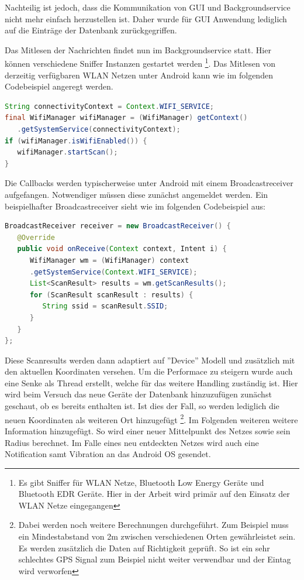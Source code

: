 \documentclass[11pt,a4paper]{article}
\begin{document}
Nachteilig ist jedoch, dass die Kommunikation von GUI und Backgroundservice nicht mehr einfach herzustellen ist. Daher wurde für GUI Anwendung lediglich auf die Einträge der Datenbank zurückgegriffen.

Das Mitlesen der Nachrichten findet nun im Backgroundservice statt. Hier können verschiedene Sniffer Instanzen gestartet werden
\footnote{Es gibt Sniffer für WLAN Netze, Bluetooth Low Energy Geräte und Bluetooth EDR Geräte. Hier in der Arbeit wird primär auf den Einsatz der WLAN Netze eingegangen}.
Das Mitlesen von derzeitig verfügbaren WLAN Netzen unter Android kann wie im folgenden Codebeispiel angeregt werden.

\begin{lstlisting}[language=Java]
String connectivityContext = Context.WIFI_SERVICE;
final WifiManager wifiManager = (WifiManager) getContext()
   .getSystemService(connectivityContext);
if (wifiManager.isWifiEnabled()) {
   wifiManager.startScan();
}
\end{lstlisting}

Die Callbacks werden typischerweise unter Android mit einem Broadcastreceiver aufgefangen. Notwendiger müssen diese zunächst angemeldet werden. Ein beispielhafter Broadcastreceiver sieht wie im folgenden Codebeispiel aus:

\begin{lstlisting}[language=Java]
BroadcastReceiver receiver = new BroadcastReceiver() {
   @Override
   public void onReceive(Context context, Intent i) {
      WifiManager wm = (WifiManager) context
      .getSystemService(Context.WIFI_SERVICE);
      List<ScanResult> results = wm.getScanResults();
      for (ScanResult scanResult : results) {
         String ssid = scanResult.SSID;
      }
   }
};
\end{lstlisting}

Diese Scanresults werden dann adaptiert auf ''Device'' Modell und zusätzlich mit den aktuellen Koordinaten versehen. Um die Performace zu steigern wurde auch eine Senke als Thread erstellt, welche für das weitere Handling zuständig ist. Hier wird beim Versuch das neue Geräte der Datenbank hinzuzufügen zunächst geschaut, ob es bereits enthalten ist. Ist dies der Fall, so werden lediglich die neuen Koordinaten als weiteren Ort hinzugefügt
\footnote{Dabei werden noch weitere Berechnungen durchgeführt. Zum Beispiel muss ein Mindestabstand von 2m zwischen verschiedenen Orten gewährleistet sein. Es werden zusätzlich die Daten auf Richtigkeit geprüft. So ist ein sehr schlechtes GPS Signal zum Beispiel nicht weiter verwendbar und der Eintag wird verworfen}.
Im Folgenden weiteren weitere Information hinzugefügt. So wird einer neuer Mittelpunkt des Netzes sowie sein Radius berechnet. Im Falle eines neu entdeckten Netzes wird auch eine Notification samt Vibration an das Android OS gesendet.
\end{document}
